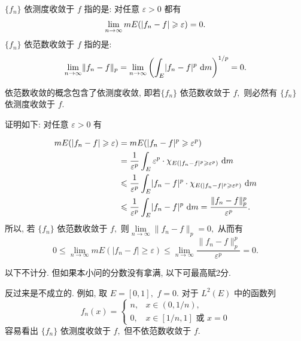 \begin{solution}
$\{ f_n \}$ 依测度收敛于 $f$ 指的是: 对任意 $\varepsilon > 0$ 都有
\begin{equation*}
\lim\limits_{n \to \infty} m E(\lvert f_n - f\rvert \geqslant \varepsilon) = 0. \score{3}
\end{equation*}
$\{ f_n \}$ 依范数收敛于 $f$ 指的是:
\begin{equation*}
\lim\limits_{n\to\infty} \lVert f_n - f \rVert_p = \lim\limits_{n\to\infty} \left(\int_E \lvert f_n - f \rvert^p ~ \mathrm{d} m \right)^{1/p} = 0. \score{3}
\end{equation*}

依范数收敛的概念包含了依测度收敛, 即若$\{ f_n \}$ 依范数收敛于 $f,$ 则必然有 $\{ f_n \}$ 依测度收敛于 $f$. 

证明如下: 对任意 $\varepsilon > 0$ 有

\begin{equation*}
\begin{aligned}
m E ( \lvert f_n - f \rvert \geqslant \varepsilon) & = m E ( \lvert f_n - f \rvert^p \geqslant \varepsilon^p) \\
& = \dfrac{1}{\varepsilon^p} \int_E \varepsilon^p \cdot \chi_{E ( \lvert f_n - f \rvert^p \geqslant \varepsilon^p)} ~ \mathrm{d} m \\
& \leqslant \dfrac{1}{\varepsilon^p} \int_E \lvert f_n - f \rvert^p \cdot \chi_{E ( \lvert f_n - f \rvert^p \geqslant \varepsilon^p)} ~ \mathrm{d} m \\
& \leqslant \dfrac{1}{\varepsilon^p} \int_E \lvert f_n - f \rvert^p ~ \mathrm{d} m = \dfrac{\lVert f_n - f \rVert_p^p}{\varepsilon^p}.
\end{aligned} \score{2}
\end{equation*}
所以, 若 $\{ f_n \}$ 依范数收敛于 $f,$ 则$\lim\limits_{n \to\infty} \lVert f_n - f \rVert_p = 0,$ 从而有
$$
0 \leqslant \lim\limits_{n \to\infty} m E ( \lvert f_n - f \rvert \geqslant \varepsilon) \leqslant \lim\limits_{n \to\infty} \dfrac{\lVert f_n - f \rVert_p^p}{\varepsilon^p} = 0.
$$

以下不计分. 但如果本小问的分数没有拿满, 以下可最高赋2分.

反过来是不成立的. 例如, 取 $E = [0, 1],$ $f = 0.$ 对于 $L^2 (E)$ 中的函数列
\begin{equation*}
f_n(x) = \begin{cases}
n, & x \in (0, 1/n), \\
0, & x \in [1/n, 1] \text{ 或 } x = 0
\end{cases}
\end{equation*}
容易看出 $\{ f_n \}$ 依测度收敛于 $f,$ 但不依范数收敛于 $f.$
\end{solution}


